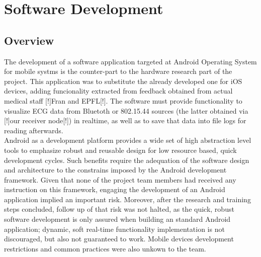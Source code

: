 \chapter{Software Development} %


	\section{Overview}

	\begin{comment}
		Microestado del arte:
		Desarrollo para dispositivos android, paradigma particular, no estamos formados en él (y esto ha dado problemas), 
arquitecturas muy particulares, en el momento de comenzar el desarrollo documentación buena pero muy técnica, más para consulta que para formación. Versiones de android para usb host, … => impone requisitos al dispositivo tablet
    (Posibilidad de hilos destruidos en cada momento, atender al giro de pantalla, destrucción de la actividad, …)
    Limitaciones de android como plataforma (java vm, opengl, …)
    Aplicación iphone: funcionalidad limitada, captura de requisitos comenzó por ella, crear un producto a partir del prototipo.
    Se añadió feedback de los médicos con que trabaja Fran en Murcia (Preguntar a Recas) (en particular los logs!)

	\end{comment}

	The development of a software application targeted at Android Operating System for mobile systms is the counter-part to the hardware research part of the project.
	This application was to substitute the already developed one for iOS devices, adding funcionality extracted from feedback obtained from actual medical staff [!]Fran and EPFL[!]. The software must provide functionality to visualize ECG data from Bluetoth or 802.15.44 sources (the latter obtained via [!]our receiver node[!]) in realtime, as well as to save that data into file logs for reading afterwards.\\

	Android as a development platform provides a wide set of high abstraction level tools to emphasize robust and reusable design for low resource based, quick development cycles. Such benefits require the adequation of the software design and architecture to the constrains imposed by the Android development framework.
	Given that none of the project team members had received any instruction on this framework, engaging the development of an Android application implied an important risk. Moreover, after the research and training steps concluded, follow up of that risk was not halted, as the quick, robust software development is only assured when building an standard Android application; dynamic, soft real-time functionality implementation is not discouraged, but also not guaranteed to work.
	Mobile devices development restrictions and common practices were also unkown to the team.\\

